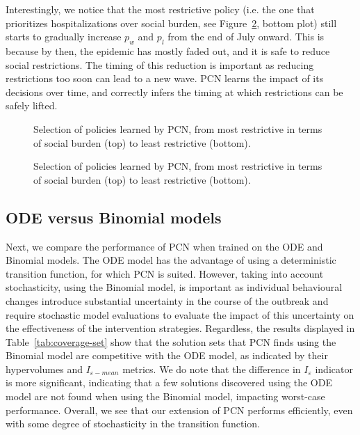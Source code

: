 \documentclass{article}
\begin{document}
Interestingly, we notice that the most restrictive policy (i.e. the one that prioritizes hospitalizations over social burden, see Figure~\ref{fig:policy-execution}, bottom plot) still starts to gradually increase $p_w$ and $p_l$ from the end of July onward. This is because by then, the epidemic has mostly faded out, and it is safe to reduce social restrictions. The timing of this reduction is important as reducing restrictions too soon can lead to a new wave. PCN learns the impact of its decisions over time, and correctly infers the timing at which restrictions can be safely lifted.

\begin{figure}
    \centering
    
    \caption{Selection of policies learned by PCN, from most restrictive in terms of social burden (top) to least restrictive (bottom).
    }
    \label{fig:policy-execution}
\end{figure}

\begin{figure}
    \centering
    
    \caption{Selection of policies learned by PCN, from most restrictive in terms of social burden (top) to least restrictive (bottom).
    }
    \label{fig:policy-execution}
\end{figure}

\subsection{ODE versus Binomial models}
\label{sec:ode-vs-binomial}

Next, we compare the performance of PCN when trained on the ODE and Binomial models. The ODE model has the advantage of using a deterministic transition function, for which PCN is suited. However, taking into account stochasticity, using the Binomial model, is important as individual behavioural changes introduce substantial uncertainty in the course of the outbreak and require stochastic model evaluations to evaluate the impact of this uncertainty on the effectiveness of the intervention strategies. Regardless, the results displayed in Table~\ref{tab:coverage-set} show that the solution sets that PCN finds using the Binomial model are competitive with the ODE model, as indicated by their hypervolumes and $I_{\varepsilon-mean}$ metrics. We do note that the difference in $I_{\varepsilon}$ indicator is more significant, indicating that a few solutions discovered using the ODE model are not found when using the Binomial model, impacting worst-case performance. Overall, we see that our extension of PCN performs efficiently, even with some degree of stochasticity in the transition function.
\end{document}
